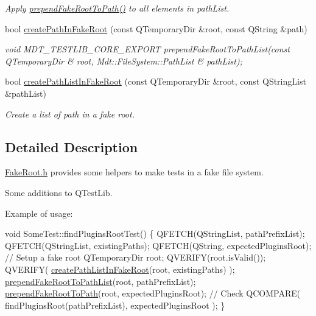 \begin{DoxyCompactItemize}
\begin{DoxyCompactList}\small\item\em Apply \hyperlink{namespace_mdt_1_1_test_lib_a78b4dd3df02000c3eb29e94495c78246}{prepend\+Fake\+Root\+To\+Path()} to all elements in {\itshape path\+List}. \end{DoxyCompactList}\item 
bool \hyperlink{namespace_mdt_1_1_test_lib_aee62fea88e830186eee0fcede5eea4a8}{create\+Path\+In\+Fake\+Root} (const Q\+Temporary\+Dir \&root, const Q\+String \&path)
\begin{DoxyCompactList}\small\item\em void M\+D\+T\+\_\+\+T\+E\+S\+T\+L\+I\+B\+\_\+\+C\+O\+R\+E\+\_\+\+E\+X\+P\+O\+RT prepend\+Fake\+Root\+To\+Path\+List(const Q\+Temporary\+Dir \& root, Mdt\+::\+File\+System\+::\+Path\+List \& path\+List); \end{DoxyCompactList}\item 
bool \hyperlink{namespace_mdt_1_1_test_lib_a5b382e44c3fb6ef9e00098460da07c50}{create\+Path\+List\+In\+Fake\+Root} (const Q\+Temporary\+Dir \&root, const Q\+String\+List \&path\+List)\hypertarget{namespace_mdt_1_1_test_lib_a5b382e44c3fb6ef9e00098460da07c50}{}\label{namespace_mdt_1_1_test_lib_a5b382e44c3fb6ef9e00098460da07c50}

\begin{DoxyCompactList}\small\item\em Create a list of path in a fake root. \end{DoxyCompactList}\end{DoxyCompactItemize}


\subsection{Detailed Description}
\hyperlink{_fake_root_8h_source}{Fake\+Root.\+h} provides some helpers to make tests in a fake file system. 

Some additions to Q\+Test\+Lib.

Example of usage\+: 
\begin{DoxyCode}
\textcolor{keywordtype}{void} SomeTest::findPluginsRootTest()
\{
 QFETCH(QStringList, pathPrefixList);
 QFETCH(QStringList, existingPaths);
 QFETCH(QString, expectedPluginsRoot);
 \textcolor{comment}{// Setup a fake root}
 QTemporaryDir root;
 QVERIFY(root.isValid());
 QVERIFY( \hyperlink{namespace_mdt_1_1_test_lib_a5b382e44c3fb6ef9e00098460da07c50}{createPathListInFakeRoot}(root, existingPaths) );
 \hyperlink{namespace_mdt_1_1_test_lib_ad65fc937f35c685a13dc5b42fc405d0a}{prependFakeRootToPathList}(root, pathPrefixList);
 \hyperlink{namespace_mdt_1_1_test_lib_a78b4dd3df02000c3eb29e94495c78246}{prependFakeRootToPath}(root, expectedPluginsRoot);
 \textcolor{comment}{// Check}
 QCOMPARE( findPluginsRoot(pathPrefixList), expectedPluginsRoot );
\}
\end{DoxyCode}
 

